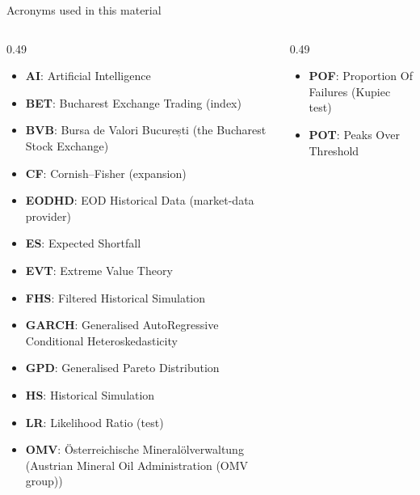 {
\begin{frame}[noframenumbering]
    \titlepage
\end{frame}
}
\begin{frame}{Acronyms used in this material}
\begin{columns}[T]
\begin{column}{0.49\textwidth}
\begin{itemize}\setlength{\itemsep}{0pt}
    \item \textbf{AI}: Artificial Intelligence
    \item \textbf{BET}: Bucharest Exchange Trading (index)
    \item \textbf{BVB}: Bursa de Valori București (the Bucharest Stock Exchange)
    \item \textbf{CF}: Cornish–Fisher (expansion)
    \item \textbf{EODHD}: EOD Historical Data (market-data provider)
    \item \textbf{ES}: Expected Shortfall
    \item \textbf{EVT}: Extreme Value Theory
    \item \textbf{FHS}: Filtered Historical Simulation
    \item \textbf{GARCH}: Generalised AutoRegressive Conditional Heteroskedasticity
    \item \textbf{GPD}: Generalised Pareto Distribution
    \item \textbf{HS}: Historical Simulation
    \item \textbf{LR}: Likelihood Ratio (test)
    \item \textbf{OMV}: Österreichische Mineralölverwaltung (Austrian Mineral Oil Administration (OMV group))
\end{itemize}
\end{column}
\begin{column}{0.49\textwidth}
\begin{itemize}\setlength{\itemsep}{0pt}
    \item \textbf{POF}: Proportion Of Failures (Kupiec test)
    \item \textbf{POT}: Peaks Over Threshold
\end{itemize}
\end{column}
\end{columns}
\end{frame}

